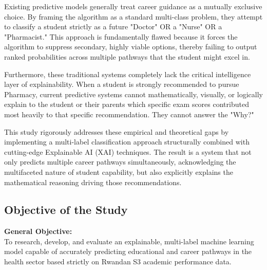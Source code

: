Existing predictive models generally treat career guidance as a mutually exclusive choice. By framing the algorithm as a standard multi-class problem, they attempt to classify a student strictly as a future "Doctor" OR a "Nurse" OR a "Pharmacist." This approach is fundamentally flawed because it forces the algorithm to suppress secondary, highly viable options, thereby failing to output ranked probabilities across multiple pathways that the student might excel in.

Furthermore, these traditional systems completely lack the critical intelligence layer of explainability. When a student is strongly recommended to pursue Pharmacy, current predictive systems cannot mathematically, visually, or logically explain to the student or their parents which specific exam scores contributed most heavily to that specific recommendation. They cannot answer the "Why?" 

This study rigorously addresses these empirical and theoretical gaps by implementing a multi-label \parencite{tsoumakas2007multi} classification approach structurally combined with cutting-edge Explainable AI (XAI) techniques. The result is a system that not only predicts multiple career pathways simultaneously, acknowledging the multifaceted nature of student capability, but also explicitly explains the mathematical reasoning driving those recommendations.

\subsection{Objective of the Study}

\textbf{General Objective:} \\
To research, develop, and evaluate an explainable, multi-label \parencite{tsoumakas2007multi} machine learning model capable of accurately predicting educational and career pathways in the health sector based strictly on Rwandan S3 academic performance data.

